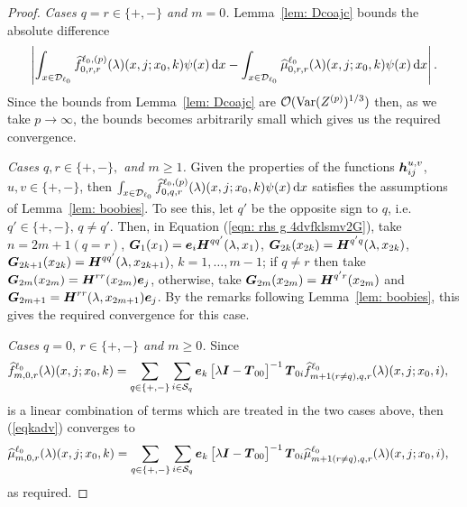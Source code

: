 \begin{proof}
	\textit{Cases \(q=r \in \{+,-\}\) and \(m=0\).} Lemma~\ref{lem: Dcoajc} bounds the absolute difference 
	\[\left|\int_{x\in\mathcal{D}_{\ell_0}}\widehat f_{0,r,r}^{\ell_0,(p)}(\lambda)(x,j;x_0,k)\psi(x)\, \mathrm{d} x-\int_{x\in\mathcal{D}_{\ell_0}}\widehat \mu_{0,r,r}^{\ell_0}(\lambda)(x,j;x_0,k)\psi(x)\, \mathrm{d} x\right|.\]
	Since the bounds from Lemma~\ref{lem: Dcoajc} are \(\mathcal O(\mathrm{Var}(Z^{(p)})^{1/3})\) then, as we take \(p \to \infty\), the bounds becomes arbitrarily small which gives us the required convergence. 

	\textit{Cases \(q,r\in \{+,-\},\) and \(m\geq 1\).} Given the properties of the functions \(\boldsymbol h_{ij}^{u,v}\), \(u,v\in\{+,-\}\), then \(\int_{x\in\mathcal{D}_{\ell_0}}\widehat f_{0,q,r}^{\ell_0,(p)}(\lambda)(x,j;x_0,k)\psi(x)\, \mathrm{d} x\) satisfies the assumptions of Lemma~\ref{lem: boobies}. To see this, let \(q'\) be the opposite sign to \(q\), i.e.~\(q'\in\{+,-\},\, q\neq q'\). Then, in Equation (\ref{eqn: rhs g 4dvfklsmv2G}), take \(n=2m+1(q=r)\), \(\boldsymbol G_1(x_1) = \boldsymbol e_i\boldsymbol H^{qq'}(\lambda, x_1)\), \(\boldsymbol G_{2k}(x_{2k}) = \boldsymbol H^{q'q}(\lambda, x_{2k})\), \(\boldsymbol G_{2k+1}(x_{2k}) = \boldsymbol H^{qq'}(\lambda, x_{2k+1})\), \(k=1,\dots,m-1\); if \(q\neq r\) then take \(\boldsymbol G_{2m}(x_{2m}) = \boldsymbol H^{rr}(x_{2m})\boldsymbol e_j\), otherwise, take \(\boldsymbol G_{2m}(x_{2m}) = \boldsymbol H^{q'r}(x_{2m})\) and \(\boldsymbol G_{2m+1} = \boldsymbol H^{rr}(\lambda,x_{2m+1})\boldsymbol e_j\). By the remarks following Lemma~\ref{lem: boobies}, this gives the required convergence for this case. 

	\textit{Cases \(q=0,\, r\in\{+,-\}\) and \(m\geq 0\).} 
	Since
	\begin{align}
		\widehat f_{m,0,r}^{\ell_0}(\lambda)(x,j;x_0,k)  
		&= \sum_{q\in\{+,-\}}\sum_{i\in\mathcal{S}_q}\boldsymbol e_k\begin{bmatrix} \lambda \boldsymbol I - \boldsymbol T_{00} \end{bmatrix}^{-1}\boldsymbol T_{0i}\widehat f_{m+1(r\neq q),q,r}^{\ell_0}(\lambda)(x,j;x_0,i), \label{eqkadv}
	\end{align}
	is a linear combination of terms which are treated in the two cases above, then (\ref{eqkadv}) converges to 
	\begin{align}
		\widehat \mu_{m,0,r}^{\ell_0}(\lambda)(x,j;x_0,k) 
		&= \sum_{q\in\{+,-\}}\sum_{i\in\mathcal{S}_q}\boldsymbol e_k\begin{bmatrix} \lambda \boldsymbol I - \boldsymbol T_{00} \end{bmatrix}^{-1}\boldsymbol T_{0i}\widehat \mu_{m+1(r\neq q),q,r}^{\ell_0}(\lambda)(x,j;x_0,i),
	\end{align}
	as required. 
\end{proof}


